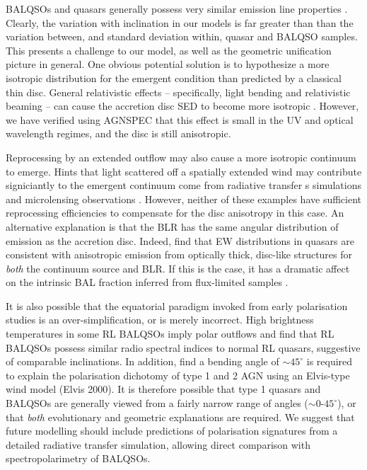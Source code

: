 \documentclass[useAMS,usenatbib]{mn2e_x}
\begin{document}
BALQSOs and quasars generally possess very similar emission line properties 
\citep[e.g.][]{weymann1991,reichard2003}. 
Clearly, the variation with inclination in our models is far greater than 
than the variation between, and standard deviation within, quasar and BALQSO samples.  
This presents a challenge to our model, as well as the geometric unification picture in general.
One obvious potential solution is to hypothesize a more isotropic distribution 
for the emergent condition than predicted by a classical thin disc. 
General relativistic effects -- specifically, light bending
and relativistic beaming -- can cause 
the accretion disc SED to become more isotropic \citep[e.g.][]{zhang1997,munozdarias2013}. 
However, we have verified using AGNSPEC \citep{hubeny2000,hubeny2001,hubenyhubeny1997}
that this effect is small in the UV and optical wavelength regimes, 
and the disc is still anisotropic.

Reprocessing by an extended outflow may also cause a more isotropic
continuum to emerge. Hints that light scattered off a spatially extended 
wind may contribute signiciantly to the emergent continuum come from radiative transfer s
simulations \citep{simproga2012} and microlensing observations \citep{sluse2015}.
However, neither of these examples have sufficient reprocessing efficiencies to 
compensate for the disc anisotropy in this case.
An alternative explanation is that the BLR has the same angular distribution 
of emission as the accretion disc.
Indeed, \cite{risaliti2011} find that EW distributions in quasars are consistent with anisotropic emission 
from optically thick, disc-like structures for {\em both} the continuum source and BLR. 
If this is the case, it has a dramatic affect on the intrinsic
BAL fraction inferred from flux-limited samples \citep{goodrich1997,krolikvoit1998}. 

It is also possible that the equatorial paradigm invoked from early polarisation
studies \citep{goodrich1995, cohen1995,brotherton2006} is an over-simplification, or is merely incorrect. 
High brightness temperatures in some RL BALQSOs imply polar outflows \citep{zhou2006} 
and \cite{bruni2012} find that
RL BALQSOs possess similar radio spectral indices to normal RL quasars, 
suggestive of comparable inclinations. 
In addition, \cite{marin2013} find a bending angle of $\sim45^\circ$ is required to 
explain the polarisation dichotomy of type 1 and 2 AGN using an Elvis-type wind 
model (Elvis 2000). It is therefore possible 
that type 1 quasars and BALQSOs are generally viewed from a fairly narrow range of angles 
($\sim0$-$45^\circ$), or that {\em both} evolutionary and geometric explanations are required.
We suggest that future modelling should include predictions of polarisation signatures
from a detailed radiative transfer simulation, allowing direct comparison with spectropolarimetry
of BALQSOs. 
\end{document}

